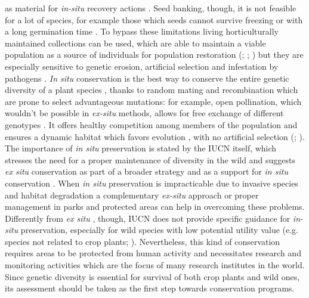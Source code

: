 \documentclass[a4paper, 12pt]{report}
\begin{document}
as material for \textit{in-situ} recovery actions \parencite{volisQuasiSituBridge2010}. Seed banking, though, it is not feasible for a lot of species, for example those which seeds cannot survive freezing \parencite{penceDefiningExceptionalSpecies2022} or with a long germination time \parencite{volisQuasiSituBridge2010}. To bypass these limitations living horticulturally maintained collections can be used, which are able to maintain a viable population as a source of individuals for population restoration (\cite{volisQuasiSituBridge2010}; \cite{iucn/sscGuidelinesUseEx2014}; \cite{penceDefiningExceptionalSpecies2022}) but they are especially sensitive to genetic
erosion, artificial selection and infestation by pathogens \parencite{volisQuasiSituBridge2010}. \textit{In situ} conservation is the best way to conserve the entire genetic diversity of a plant species \parencite{whitlockConsequencesInsituStrategies2016}, thanks to random mating and recombination which are prone to select advantageous mutations: for example, open pollination, which wouldn't be possible in \textit{ex-situ} methods, allows for free exchange of different genotypes \parencite{salgotraGeneticDiversityConservation2023}. It offers healthy competition among members of the population and ensures a dynamic habitat which favors evolution \parencite{vijayanGermplasmConservationMulberry2011}, with no artificial selection (\cite{iucn/sscGuidelinesUseEx2014}; \cite{salgotraGeneticDiversityConservation2023}). The importance of \textit{in situ} preservation is stated by the IUCN itself, which stresses the need for a proper maintenance of diversity in the wild \parencite{whitlockConsequencesInsituStrategies2016} and suggests \textit{ex situ} conservation as part of a broader strategy and as a support for \textit{in situ} conservation \parencite{iucn/sscGuidelinesUseEx2014}. When \textit{in situ} preservation is impracticable due to invasive species and habitat degradation \parencite{hobanOptimalSamplingSeeds2014} a complementary \textit{ex-situ} approach \parencite{salgotraGeneticDiversityConservation2023} or proper management in parks and protected areas can help in overcoming these problems. Differently from \textit{ex situ} \parencite{iucn/sscGuidelinesUseEx2014}, though, IUCN does not provide specific guidance for \textit{in-situ} preservation, especially for wild species with low potential utility value (e.g. species not related to crop plants; \cite{whitlockConsequencesInsituStrategies2016}). Nevertheless, this kind of conservation requires areas to be protected from human activity \parencite{suppleConservationBiodiversityGenomics2018} and necessitates research and monitoring activities which are the focus of many research institutes in the world. Since genetic diversity is essential for survival of both crop plants \parencite{reddyReviewPotatoSolanum2018} and wild ones, its assessment should be taken as the first step towards conservation programs.
\end{document}
